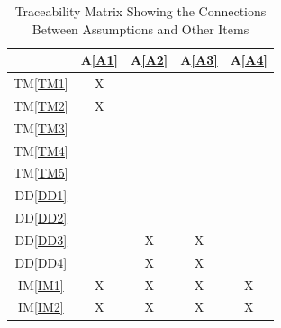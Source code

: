 \documentclass[12pt]{article}
\newcommand{\ddref}[1]{DD\ref{#1}}
\newcommand{\tref}[1]{TM\ref{#1}}
\newcommand{\aref}[1]{A\ref{#1}}
\newcommand{\iref}[1]{IM\ref{#1}}
\begin{document}
\begin{table}[h!]
  \centering
  \begin{tabular}{|c|c|c|c|c|}
    \hline
                & \aref{A1} & \aref{A2} & \aref{A3} & \aref{A4} \\
    \hline
    \tref{TM1}  & X         &           &           &           \\ \hline
    \tref{TM2}  & X         &           &           &           \\ \hline
    \tref{TM3}  &           &           &           &           \\ \hline
    \tref{TM4}  &           &           &           &           \\ \hline
    \tref{TM5}  &           &           &           &           \\ \hline
    \ddref{DD1} &           &           &           &           \\ \hline
    \ddref{DD2} &           &           &           &           \\ \hline
    \ddref{DD3} &           & X         & X         &           \\ \hline
    \ddref{DD4} &           & X         & X         &           \\ \hline
    \iref{IM1}  & X         & X         & X         & X         \\ \hline
    \iref{IM2}  & X         & X         & X         & X         \\ \hline
  \end{tabular}
  \caption{Traceability Matrix Showing the Connections Between Assumptions and Other Items}
  \label{Table:A_trace}
\end{table}
\end{document}
